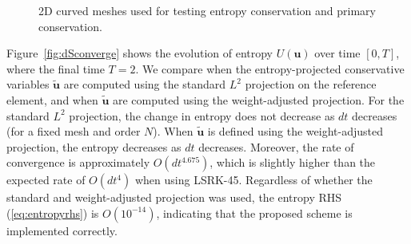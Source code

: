\documentclass[10pt]{amsart}
\theoremstyle{definition}
\theoremstyle{lemma}
\theoremstyle{theorem}
\theoremstyle{assumption}
\renewcommand{\tilde}{\widetilde}
\begin{document}
{\begin{figure}
\centering
{}
\hspace{1em}
\caption{2D curved meshes used for testing entropy conservation and primary conservation.}
\label{fig:warp2d}
\end{figure}

Figure~\ref{fig:dSconverge} shows the evolution of entropy $U(\bm{u})$ over time $[0,T]$, where the final time $T = 2$.  We compare when the entropy-projected conservative variables $\tilde{\bm{u}}$ are computed using the standard $L^2$ projection on the reference element, and when $\tilde{\bm{u}}$ are computed using the weight-adjusted projection.  For the standard $L^2$ projection, the change in entropy does not decrease as $dt$ decreases (for a fixed mesh and order $N$).  When $\tilde{\bm{u}}$ is defined using the weight-adjusted projection, the entropy decreases as $dt$ decreases.  Moreover, the rate of convergence is approximately $O(dt^{4.675})$, which is slightly higher than the expected rate of $O(dt^4)$ when using LSRK-45.  Regardless of whether the standard and weight-adjusted projection was used, the entropy RHS (\ref{eq:entropyrhs}) is $O(10^{-14})$, indicating that the proposed scheme is implemented correctly.  

\begin{figure}
\centering
{}
\end{figure}}
\end{document}
